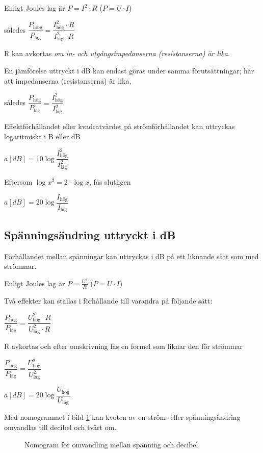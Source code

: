 Enligt Joules lag är \(P = I^2 \cdot R\) (\(P = U \cdot I\))

således \(\dfrac{P_\text{h{\oe}g}}{P_\text{l{\aa}g}} = \dfrac{I_\text{hög}^2 \cdot R}{I_\text{l{\aa}g}^2 \cdot R}\)

R kan avkortas \emph{om in- och utgångsimpedanserna (resistanserna) är lika}.

En jämförelse uttryckt i dB kan endast göras
under samma förutsättningar; här att impedanserna (resistanserna) är lika,

således \(\dfrac{P_\text{hög}}{P_\text{låg}} = \dfrac{I_\text{hög}^2}{I_\text{låg}^2}\)

Effektförhållandet eller kvadratvärdet på
strömförhållandet kan uttryckas logaritmiskt
i B eller dB

\(a[dB] = 10\log \dfrac{I_\text{hög}^2}{I_\text{låg}^2}\)

Eftersom \(\log x^2 = 2 \cdot \log x\), fås slutligen

\(a[dB] = 20\log \dfrac{I_\text{hög}}{I_\text{låg}}\)

\subsection{Spänningsändring uttryckt i dB}

Förhållandet mellan spänningar kan uttryckas i dB på ett liknande sätt som med
strömmar.

Enligt Joules lag är \(P = \frac{U^2}{R}\) (\(P = U \cdot I\))

Två effekter kan ställas i förhållande till varandra på följande sätt:

\(\dfrac{P_\text{hög}}{P_\text{låg}}=\dfrac{U_\text{hög}^2 \cdot R}{U_\text{låg}^2 \cdot R}\)

R avkortas och efter omskrivning fås en formel som liknar den för strömmar

\(\dfrac{P_\text{hög}}{P_\text{låg}} = \dfrac{U_\text{hög}^2}{U_\text{låg}^2}\)

\(a[dB] = 20\log \dfrac{U_\text{hög}}{U_\text{låg}}\)

Med nomogrammet i bild \ref{ellära-nomogram-db-spänning} kan kvoten av en ström- eller spänningsändring omvandlas
till decibel och tvärt om.

\begin{figure}
  \caption{Nomogram för omvandling mellan spänning och decibel}
  \label{ellära-nomogram-db-spänning}
\end{figure}

